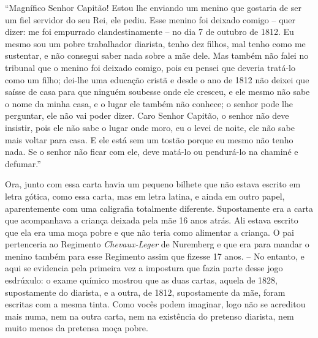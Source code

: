``Magnífico Senhor Capitão! Estou lhe enviando um menino que gostaria de
ser um fiel servidor do seu Rei, ele pediu. Esse menino foi deixado
comigo -- quer dizer: me foi empurrado clandestinamente -- no dia 7 de
outubro de 1812. Eu mesmo sou um pobre trabalhador diarista, tenho dez
filhos, mal tenho como me sustentar, e não consegui saber nada sobre a
mãe dele. Mas também não falei no tribunal que o menino foi deixado
comigo, pois eu pensei que deveria tratá-lo como um filho; dei-lhe uma
educação cristã e desde o ano de 1812 não deixei que saísse de casa para
que ninguém soubesse onde ele cresceu, e ele mesmo não sabe o nome da
minha casa, e o lugar ele também não conhece; o senhor pode lhe
perguntar, ele não vai poder dizer. Caro Senhor Capitão, o senhor não
deve insistir, pois ele não sabe o lugar onde moro, eu o levei de noite,
ele não sabe mais voltar para casa. E ele está sem um tostão porque eu
mesmo não tenho nada. Se o senhor não ficar com ele, deve matá-lo ou
pendurá-lo na chaminé e defumar.''

Ora, junto com essa carta havia um pequeno bilhete que não estava
escrito em letra gótica, como essa carta, mas em letra latina, e ainda
em outro papel, aparentemente com uma caligrafia totalmente diferente.
Supostamente era a carta que acompanhava a criança deixada pela mãe 16
anos atrás. Ali estava escrito que ela era uma moça pobre e que não
teria como alimentar a criança. O pai pertenceria ao Regimento
\emph{Chevaux-Leger} de Nuremberg e que era para mandar o menino também
para esse Regimento assim que fizesse 17 anos. -- No entanto, e aqui se
evidencia pela primeira vez a impostura que fazia parte desse jogo
esdrúxulo: o exame químico mostrou que as duas cartas, aquela de 1828,
supostamente do diarista, e a outra, de 1812, supostamente da mãe, foram
escritas com a mesma tinta. Como vocês podem imaginar, logo não se
acreditou mais numa, nem na outra carta, nem na existência do pretenso
diarista, nem muito menos da pretensa moça pobre.

